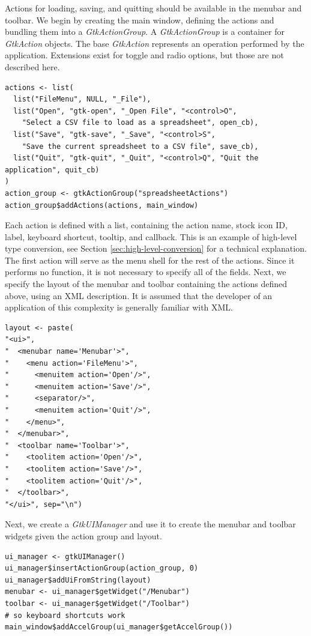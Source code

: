 \documentclass[article]{jss}
\begin{document}
Actions for loading, saving, and quitting
should be available in the menubar and toolbar. We begin by creating the
main window, defining the actions and bundling them into a \emph{GtkActionGroup}.
A \emph{GtkActionGroup} is a container for \emph{GtkAction} objects. The base
\emph{GtkAction} represents an operation performed by the application. Extensions
exist for toggle and radio options, but those are not described here.
\begin{verbatim}
actions <- list(
  list("FileMenu", NULL, "_File"), 
  list("Open", "gtk-open", "_Open File", "<control>O", 
    "Select a CSV file to load as a spreadsheet", open_cb),
  list("Save", "gtk-save", "_Save", "<control>S", 
    "Save the current spreadsheet to a CSV file", save_cb),
  list("Quit", "gtk-quit", "_Quit", "<control>Q", "Quit the application", quit_cb)
)
action_group <- gtkActionGroup("spreadsheetActions")
action_group$addActions(actions, main_window)
\end{verbatim}
Each action is defined with a list, containing the action name, stock icon ID,
label, keyboard shortcut, tooltip, and callback. This is an example of 
high-level type conversion, see Section \ref{sec:high-level-conversion} for
a technical explanation. The first action will serve as 
the menu shell for the rest of the actions. Since it performs no
function, it is not necessary to specify all of the fields. Next, we specify
the layout of the menubar and toolbar containing the actions defined above, using
an XML description. It is assumed that the developer of an application of
this complexity is generally familiar with XML.
\begin{verbatim}
layout <- paste(
"<ui>",
"  <menubar name='Menubar'>",
"    <menu action='FileMenu'>",
"      <menuitem action='Open'/>",
"      <menuitem action='Save'/>",
"      <separator/>",
"      <menuitem action='Quit'/>",
"    </menu>",
"  </menubar>",
"  <toolbar name='Toolbar'>",
"    <toolitem action='Open'/>",
"    <toolitem action='Save'/>",
"    <toolitem action='Quit'/>",
"  </toolbar>",
"</ui>", sep="\n")
\end{verbatim}
Next, we create a \emph{GtkUIManager} and use it to create the menubar and
toolbar widgets given the action group and layout.
\begin{verbatim}
ui_manager <- gtkUIManager()
ui_manager$insertActionGroup(action_group, 0)
ui_manager$addUiFromString(layout)
menubar <- ui_manager$getWidget("/Menubar")
toolbar <- ui_manager$getWidget("/Toolbar")
# so keyboard shortcuts work
main_window$addAccelGroup(ui_manager$getAccelGroup()) 
\end{verbatim}
\end{document}

